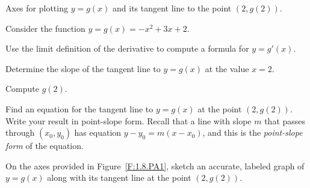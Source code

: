 \begin{marginfigure}[8cm]
\caption{Axes for plotting $y = g(x)$ and its tangent line to the point $(2,g(2))$.} \label{F:1.8.PA1}
\end{marginfigure}

\begin{pa} \label{PA:3.6}
Consider the function $y = g(x) = -x^2+3x+2$.

\ba
	\item Use the limit definition of the derivative to compute a formula for $y = g'(x)$.
	\item Determine the slope of the tangent line to $y = g(x)$ at the value $x = 2$.
	\item Compute $g(2)$.
	\item Find an equation for the tangent line to $y = g(x)$ at the point $(2,g(2))$.  Write your result in point-slope form. Recall that a line with slope $m$ that passes through $(x_0,y_0)$ has equation $y - y_0 = m(x - x_0)$, and this is the \emph{point-slope form} of the equation.
	\item On the axes provided in Figure~\ref{F:1.8.PA1}, sketch an accurate, labeled graph of $y = g(x)$ along with its tangent line at the point $(2,g(2))$.
\ea
\end{pa} 

\afterpa

